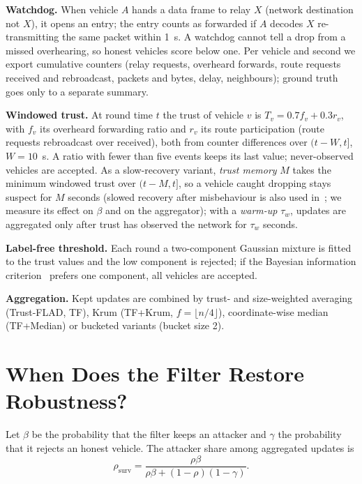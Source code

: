 \documentclass[conference]{IEEEtran}
\newcommand{\rsurv}{\rho_{\mathrm{surv}}}
\begin{document}
\textbf{Watchdog.} When vehicle $A$ hands a data frame to relay $X$ (network destination not $X$), it opens an entry;
the entry counts as forwarded if $A$ decodes $X$ re-transmitting the same packet within 1~s. A watchdog cannot tell a
drop from a missed overhearing, so honest vehicles score below one. Per vehicle and second we export cumulative
counters (relay requests, overheard forwards, route requests received and rebroadcast, packets and bytes, delay,
neighbours); ground truth goes only to a separate summary.

\textbf{Windowed trust.} At round time $t$ the trust of vehicle $v$ is $T_v = 0.7 f_v + 0.3 r_v$, with $f_v$ its
overheard forwarding ratio and $r_v$ its route participation (route requests rebroadcast over received), both from
counter differences over $(t - W, t]$, $W = 10$~s. A ratio with fewer than five events keeps its last value;
never-observed vehicles are accepted. As a slow-recovery variant, \emph{trust memory} $M$ takes the minimum windowed
trust over $(t - M, t]$, so a vehicle caught dropping stays suspect for $M$ seconds (slowed recovery after
misbehaviour is also used in~\cite{titsrc2026}; we measure its effect on $\beta$ and on the aggregator); with a \emph{warm-up} $\tau_w$,
updates are aggregated only after trust has observed the network for $\tau_w$ seconds.

\textbf{Label-free threshold.} Each round a two-component Gaussian mixture is fitted to the trust values and the low
component is rejected; if the Bayesian information criterion~\cite{schwarz1978} prefers one component, all vehicles are accepted.

\textbf{Aggregation.} Kept updates are combined by trust- and size-weighted averaging (Trust-FLAD, TF), Krum
(TF+Krum, $f = \lfloor n/4 \rfloor$), coordinate-wise median (TF+Median) or bucketed variants (bucket size 2).

\section{When Does the Filter Restore Robustness?}
\label{sec:analysis}

Let $\beta$ be the probability that the filter keeps an attacker and $\gamma$ the probability that it rejects an
honest vehicle. The attacker share among aggregated updates is
\begin{equation}
\rsurv = \frac{\rho\beta}{\rho\beta + (1-\rho)(1-\gamma)}.
\label{eq:surv}
\end{equation}
\end{document}
